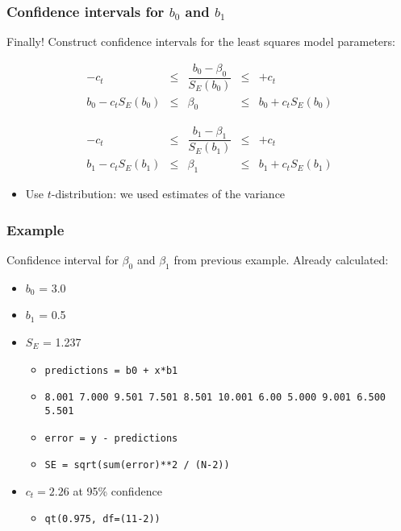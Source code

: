 \begin{frame}\frametitle{Confidence intervals for $b_0$ and $b_1$}

	Finally! Construct confidence intervals for the least squares model parameters:

	$$
	\begin{array}{rcccl}
		- c_t &\leq& \dfrac{b_0 - \beta_0}{S_E(b_0)} &\leq & +c_t \\
		b_0 - c_t S_E(b_0) &\leq& \beta_0 &\leq& b_0 + c_t S_E(b_0)
	\end{array}
	$$

	\vspace{24pt}

	$$
	\begin{array}{rcccl}
		- c_t &\leq& \dfrac{b_1 - \beta_1}{S_E(b_1)} &\leq & +c_t\\
		b_1 - c_t S_E(b_1) &\leq& \beta_1 &\leq& b_1 + c_t S_E(b_1)
	\end{array}
	$$
	\begin{itemize}
		\item	Use $t$-distribution: we used estimates of the variance
	\end{itemize}
\end{frame}

\begin{frame}\frametitle{Example}

	Confidence interval for $\beta_0$ and $\beta_1$ from previous example. Already calculated:
	\begin{itemize}
		\item	$b_0$ = 3.0
		\item	$b_1$ = 0.5
		\item	$S_E$ = 1.237
		\begin{itemize}
			\item	\texttt{predictions = b0 + x*b1}
			\item	\texttt{8.001 7.000 9.501 7.501 8.501 10.001 6.00 5.000 9.001 6.500 5.501}
			\item	\texttt{error = y - predictions}
			\item	\texttt{SE = sqrt(sum(error)**2 / (N-2))}
		\end{itemize}
		\item	$c_t = 2.26$ at 95\% confidence
		\begin{itemize}
			\item	\texttt{qt(0.975, df=(11-2))}
		\end{itemize}
	\end{itemize}
\end{frame}

